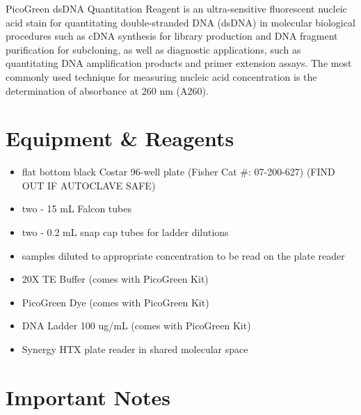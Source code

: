 \documentclass[
  letterpaper,
  DIV=11,
  numbers=noendperiod]{scrreprt}
\begin{document}

PicoGreen dsDNA Quantitation Reagent is an ultra-sensitive fluorescent
nucleic acid stain for quantitating double-stranded DNA (dsDNA) in
molecular biological procedures such as cDNA synthesis for library
production and DNA fragment purification for subcloning, as well as
diagnostic applications, such as quantitating DNA amplification products
and primer extension assays. The most commonly used technique for
measuring nucleic acid concentration is the determination of absorbance
at 260 nm (A260).

\hypertarget{equipment-reagents}{%
\section*{\texorpdfstring{\textbf{Equipment \&
Reagents}}{Equipment \& Reagents}}\label{equipment-reagents}}


\begin{itemize}
\item
  flat bottom black Costar 96-well plate (Fisher Cat \#: 07-200-627)
  (FIND OUT IF AUTOCLAVE SAFE)
\item
  two - 15 mL Falcon tubes
\item
  two - 0.2 mL snap cap tubes for ladder dilutions
\item
  samples diluted to appropriate concentration to be read on the plate
  reader
\item
  20X TE Buffer (comes with PicoGreen Kit)
\item
  PicoGreen Dye (comes with PicoGreen Kit)
\item
  DNA Ladder 100 ug/mL (comes with PicoGreen Kit)
\item
  Synergy HTX plate reader in shared molecular space
\end{itemize}

\hypertarget{important-notes}{%
\section*{\texorpdfstring{\textbf{Important
Notes}}{Important Notes}}\label{important-notes}}

\end{document}
